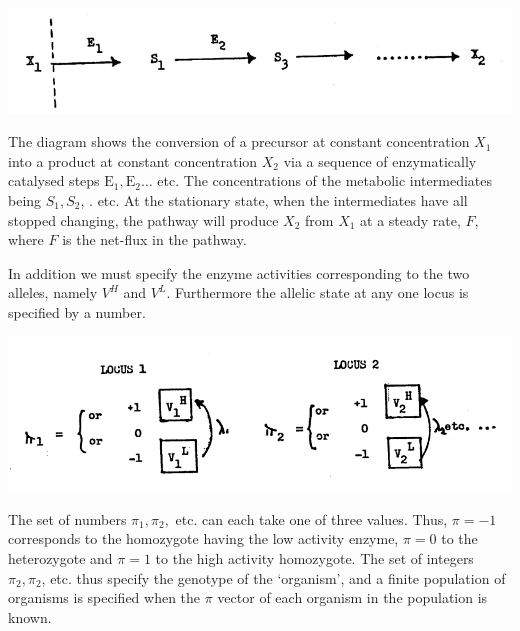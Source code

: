 \includegraphics[max width=\textwidth, center]{figure5_1}

The diagram shows the conversion of a precursor at constant concentration $X_1$ into a product at constant concentration $X_2$ via a sequence of enzymatically catalysed steps $\mathrm{E}_1, \mathrm{E}_2 \ldots$ etc. The concentrations of the metabolic intermediates being $S_1, S_2$, . etc. At the stationary state, when the intermediates have all stopped changing, the pathway will produce $X_2$ from $X_1$ at a steady rate, $F$, where $F$ is the net-flux in the pathway.

In addition we must specify the enzyme activities corresponding to the two alleles, namely $V^H$ and $V^L$. Furthermore the allelic state at any one locus is specified by a number.

\begin{center}
\includegraphics[max width=\textwidth]{figure5_locus.png}
\end{center}

The set of numbers $\pi_{1}, \pi_2,$ etc. can each take one of three values. Thus, $\pi=-1$ corresponds to the homozygote having the low activity enzyme, $\pi=0$ to the heterozygote and $\pi=1$ to the high activity homozygote. The set of integers $\pi_{2}, \pi_{2}$, etc. thus specify the genotype of the `organism', and a finite population of organisms is specified when the $\pi$ vector of each organism in the population is known.

